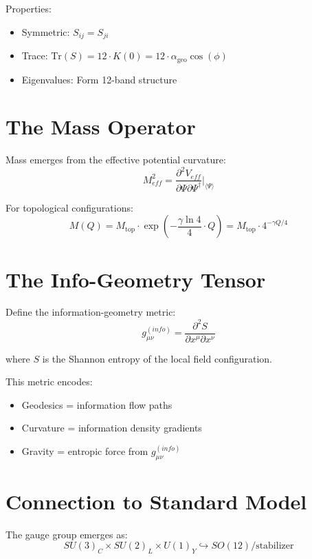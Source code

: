 \documentclass[11pt, a4paper]{article}
\theoremstyle{remark}
\newcommand{\alphageo}{\alpha_{\text{geo}}}
\newcommand{\Mtop}{M_{\text{top}}}
\begin{document}
Properties:
\begin{itemize}
    \item Symmetric: $S_{ij} = S_{ji}$
    \item Trace: $\text{Tr}(S) = 12 \cdot K(0) = 12 \cdot \alphageo \cos(\phi)$
    \item Eigenvalues: Form 12-band structure
\end{itemize}

\section{The Mass Operator}

Mass emerges from the effective potential curvature:
\begin{equation}
M^2_{eff} = \frac{\partial^2 V_{eff}}{\partial \Psi \partial \Psi^\dagger}\bigg|_{\langle\Psi\rangle}
\end{equation}

For topological configurations:
\begin{equation}
M(Q) = \Mtop \cdot \exp\left(-\frac{\gamma \ln 4}{4} \cdot Q\right) = \Mtop \cdot 4^{-\gamma Q/4}
\end{equation}

\section{The Info-Geometry Tensor}

Define the information-geometry metric:
\begin{equation}
g_{\mu\nu}^{(info)} = \frac{\partial^2 S}{\partial x^\mu \partial x^\nu}
\end{equation}

where $S$ is the Shannon entropy of the local field configuration.

This metric encodes:
\begin{itemize}
    \item Geodesics = information flow paths
    \item Curvature = information density gradients
    \item Gravity = entropic force from $g_{\mu\nu}^{(info)}$
\end{itemize}

\section{Connection to Standard Model}

The gauge group emerges as:
\begin{equation}
SU(3)_C \times SU(2)_L \times U(1)_Y \hookrightarrow SO(12) / \text{stabilizer}
\end{equation}
\end{document}

